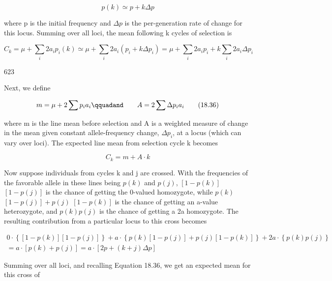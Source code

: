 \documentclass{article}
\begin{document}
\begin{equation}
p(k)\simeq p+k\Delta p
\end{equation}

where p is the initial frequency and  $ \Delta p $ is the per-generation rate of change for this locus. Summing over all loci, the mean following k cycles of selection is

\begin{equation}
C_{k}=\mu+\sum_{i}2a_{i}p_{i}(k)\simeq\mu+\sum_{i}2a_{i}(p_{i}+k\Delta p_{i})=\mu+\sum_{i}2a_{i}p_{i}+k\sum_{i}2a_{i}\Delta p_{i}
\end{equation}

623

Next, we define

\begin{equation}
m=\mu+2\sum p_{i}a_{i}\qquadand\qquad A=2\sum\Delta p_{i}a_{i}
\tag{18.36}
\label{eq:18_36}
\end{equation}

where m is the line mean before selection and A is a weighted measure of change in the mean given constant allele-frequency change,  $ \Delta p_{i} $, at a locus (which can vary over loci). The expected line mean from selection cycle k becomes

\begin{equation}
C_{k}=m+A\cdot k
\tag{18.37a}
\label{eq:18_37a}
\end{equation}

Now suppose individuals from cycles k and j are crossed. With the frequencies of the favorable allele in these lines being  $ p(k) $ and  $ p(j) $,  $ [1-p(k)] $  $ [1-p(j)] $ is the chance of getting the 0-valued homozygote, while  $ p(k) $  $ [1-p(j)]+p(j) $  $ [1-p(k)] $ is the chance of getting an a-value heterozygote, and  $ p(k)p(j) $ is the chance of getting a 2a homozygote. The resulting contribution from a particular locus to this cross becomes

\begin{equation}
\begin{align*}0\cdot\left\{\left[1-p(k)\right]\left[1-p(j)\right]\right\}+a\cdot\left\{p(k)\left[1-p(j)\right]+p(j)\left[1-p(k)\right]\right\}+2a\cdot\left\{p(k)p(j)\right\}\\=a\cdot\left[p(k)+p(j)\right]=a\cdot\left[2p+(k+j)\Delta p\right]\end{align*}
\end{equation}

Summing over all loci, and recalling Equation 18.36, we get an expected mean for this cross of
\end{document}
